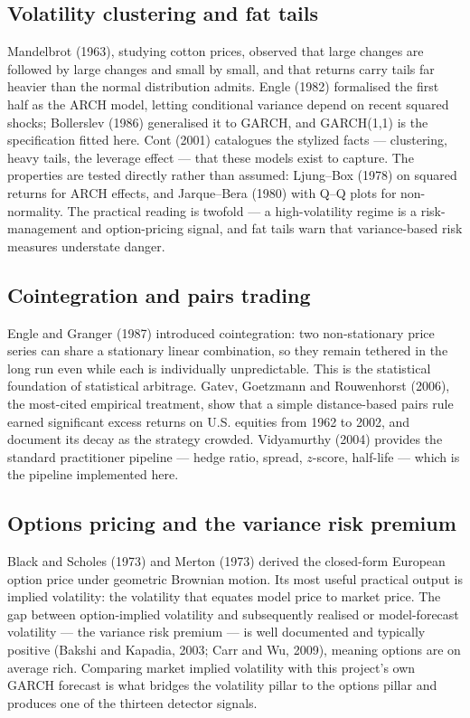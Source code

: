 \documentclass[11pt,a4paper]{article}
\begin{document}
\subsection{Volatility clustering and fat tails}

Mandelbrot (1963), studying cotton prices, observed that large changes are followed by
large changes and small by small, and that returns carry tails far heavier than the normal
distribution admits. Engle (1982) formalised the first half as the ARCH model, letting
conditional variance depend on recent squared shocks; Bollerslev (1986) generalised it to
GARCH, and GARCH(1,1) is the specification fitted here. Cont (2001) catalogues the
stylized facts --- clustering, heavy tails, the leverage effect --- that these models exist
to capture. The properties are tested directly rather than assumed: Ljung--Box (1978) on
squared returns for ARCH effects, and Jarque--Bera (1980) with Q--Q plots for
non-normality. The practical reading is twofold --- a high-volatility regime is a
risk-management and option-pricing signal, and fat tails warn that variance-based risk
measures understate danger.

\subsection{Cointegration and pairs trading}

Engle and Granger (1987) introduced cointegration: two non-stationary price series can
share a stationary linear combination, so they remain tethered in the long run even while
each is individually unpredictable. This is the statistical foundation of statistical
arbitrage. Gatev, Goetzmann and Rouwenhorst (2006), the most-cited empirical treatment,
show that a simple distance-based pairs rule earned significant excess returns on U.S.
equities from 1962 to 2002, and document its decay as the strategy crowded. Vidyamurthy
(2004) provides the standard practitioner pipeline --- hedge ratio, spread, $z$-score,
half-life --- which is the pipeline implemented here.

\subsection{Options pricing and the variance risk premium}

Black and Scholes (1973) and Merton (1973) derived the closed-form European option price
under geometric Brownian motion. Its most useful practical output is implied volatility:
the volatility that equates model price to market price. The gap between option-implied
volatility and subsequently realised or model-forecast volatility --- the variance risk
premium --- is well documented and typically positive (Bakshi and Kapadia, 2003; Carr and
Wu, 2009), meaning options are on average rich. Comparing market implied volatility with
this project's own GARCH forecast is what bridges the volatility pillar to the options
pillar and produces one of the thirteen detector signals.
\end{document}
